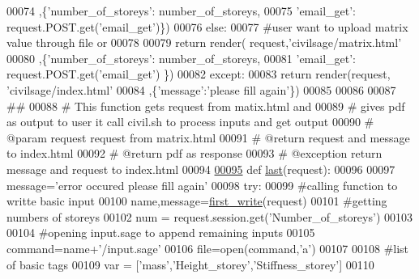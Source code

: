 \begin{DoxyCode}
00074             ,\{\textcolor{stringliteral}{'number\_of\_storeys'}: number\_of\_storeys,
00075             \textcolor{stringliteral}{'email\_get'}: request.POST.get(\textcolor{stringliteral}{'email\_get'})\})
00076         \textcolor{keywordflow}{else}:
00077         \textcolor{comment}{#user want to upload matrix value through file or}
00078         
00079             \textcolor{keywordflow}{return} render( request,\textcolor{stringliteral}{'civilsage/matrix.html'}
00080             ,\{\textcolor{stringliteral}{'number\_of\_storeys'}: number\_of\_storeys,
00081             \textcolor{stringliteral}{'email\_get'}: request.POST.get(\textcolor{stringliteral}{'email\_get'}) \})
00082     \textcolor{keywordflow}{except}:
00083         \textcolor{keywordflow}{return} render(request, \textcolor{stringliteral}{'civilsage/index.html'}
00084         ,\{\textcolor{stringliteral}{'message'}:\textcolor{stringliteral}{'please fill again'}\})
00085 
00086 
00087 \textcolor{comment}{##}
00088 \textcolor{comment}{# This function gets request from matix.html and}
00089 \textcolor{comment}{# gives pdf as output to user it call civil.sh to process inputs and get output}
00090 \textcolor{comment}{# @param request request from matrix.html}
00091 \textcolor{comment}{# @return request and message to index.html }
00092 \textcolor{comment}{# @return pdf as response }
00093 \textcolor{comment}{# @exception return message and request to index.html}
00094 
\hypertarget{views_8py_source_l00095}{}\hyperlink{namespacecivilsage_1_1views_aed47fb0740a2fa14693f697905788719}{00095} \textcolor{keyword}{def }\hyperlink{namespacecivilsage_1_1views_aed47fb0740a2fa14693f697905788719}{last}(request):
00096 
00097     message=\textcolor{stringliteral}{'error occured please fill again'}
00098     \textcolor{keywordflow}{try}:
00099         \textcolor{comment}{#calling function to writte basic input}
00100         name,message=\hyperlink{namespacecivilsage_1_1views_ad9397359f36a9df37e0aa43f3be032a3}{first\_write}(request)
00101         \textcolor{comment}{#getting numbers of storeys}
00102         num = request.session.get(\textcolor{stringliteral}{'Number\_of\_storeys'})
00103 
00104         \textcolor{comment}{#opening input.sage to append remaining inputs}
00105         command=name+\textcolor{stringliteral}{'/input.sage'}
00106         file=open(command,\textcolor{stringliteral}{'a'})
00107 
00108         \textcolor{comment}{#list of basic tags}
00109         var = [\textcolor{stringliteral}{'mass'},\textcolor{stringliteral}{'Height\_storey'},\textcolor{stringliteral}{'Stiffness\_storey'}]
00110 

\end{DoxyCode}
